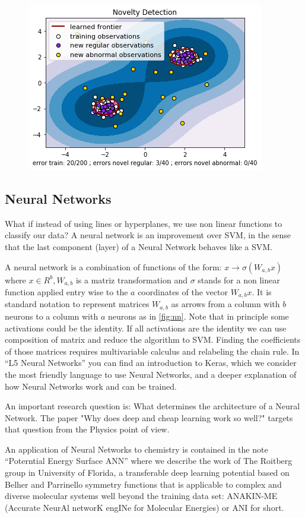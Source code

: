 \documentclass[11pt,letterpaper]{report}
\begin{document}
	\begin{figure}[h!]
		\centering
		\includegraphics[width=0.45\linewidth]{figures/novelty.png}
		\caption{}
		\label{fig:novelty}
	\end{figure} 
	
	\subsection{Neural Networks}  
	
	What if instead of using lines or hyperplanes, we use non linear functions to classify our data? A neural network is an improvement over SVM, in the sense that the last component (layer) of a Neural Network behaves like a SVM.
	
	 A neural network is a combination of  functions of the form:
	$x\rightarrow \sigma(W_{a,b}x)$ where $x\in R^b,  W_{a,b}$ is a matriz transformation and $\sigma$ stands for a non linear function applied entry wise to the $a$ coordinates of the vector  $W_{a,b}x.$
	It is standard notation to represent matrices  $W_{a,b}$ as arrows from a column with $b$ neurons to a column with $a$ neurons as in \ref{fig:nn}. Note that in principle some activations could be the identity. If all activations are the identity we can use composition of matrix and reduce the algorithm to SVM. Finding the coefficients of those matrices requires multivariable calculus and relabeling the chain rule. In ``L5 Neural Networks'' you can find an introduction to Keras, which we consider the most friendly language to use Neural Networks, and a deeper explanation of how Neural Networks work and can be trained.	
	
	An important research question is: What determines the architecture of a Neural Network.  The paper "Why does deep and cheap learning work so well?" targets that question from the Physics point of view.
	
	
	An application of Neural Networks to chemistry is contained in the note ``Poterntial Energy Surface ANN'' where we describe the work of The Roitberg group in University of Florida, a transferable deep learning potential based on Belher and Parrinello symmetry functions that is applicable to complex and diverse molecular systems well beyond the training data set: ANAKIN-ME (Accurate NeurAl networK engINe for Molecular Energies) or ANI for short.
	
\end{document}
